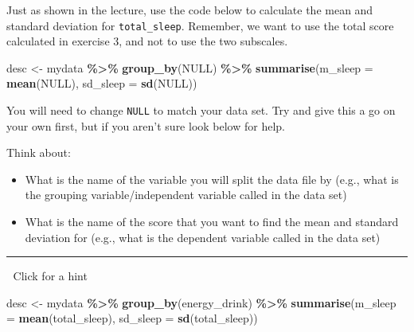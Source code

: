 \documentclass[
]{book}
\newenvironment{Shaded}{\begin{snugshade}}{\end{snugshade}}
\newcommand{\AttributeTok}[1]{\textcolor[rgb]{0.13,0.29,0.53}{#1}}
\newcommand{\ConstantTok}[1]{\textcolor[rgb]{0.56,0.35,0.01}{#1}}
\newcommand{\FunctionTok}[1]{\textcolor[rgb]{0.13,0.29,0.53}{\textbf{#1}}}
\newcommand{\NormalTok}[1]{#1}
\newcommand{\OtherTok}[1]{\textcolor[rgb]{0.56,0.35,0.01}{#1}}
\newcommand{\SpecialCharTok}[1]{\textcolor[rgb]{0.81,0.36,0.00}{\textbf{#1}}}
\begin{document}
Just as shown in the lecture, use the code below to calculate the mean and standard deviation for \texttt{total\_sleep}. Remember, we want to use the total score calculated in exercise 3, and not to use the two subscales.

\begin{Shaded}
\begin{Highlighting}[]
\NormalTok{desc }\OtherTok{\textless{}{-}}\NormalTok{  mydata }\SpecialCharTok{\%\textgreater{}\%}
  \FunctionTok{group\_by}\NormalTok{(}\ConstantTok{NULL}\NormalTok{) }\SpecialCharTok{\%\textgreater{}\%}
  \FunctionTok{summarise}\NormalTok{(}\AttributeTok{m\_sleep =} \FunctionTok{mean}\NormalTok{(}\ConstantTok{NULL}\NormalTok{),}
            \AttributeTok{sd\_sleep =} \FunctionTok{sd}\NormalTok{(}\ConstantTok{NULL}\NormalTok{))}
\end{Highlighting}
\end{Shaded}

You will need to change \texttt{NULL} to match your data set. Try and give this a go on your own first, but if you aren't sure look below for help.

Think about:

\begin{itemize}
\item
  What is the name of the variable you will split the data file by (e.g., what is the grouping variable/independent variable called in the data set)
\item
  What is the name of the score that you want to find the mean and standard deviation for (e.g., what is the dependent variable called in the data set)
\end{itemize}

\begin{center}\rule{0.5\linewidth}{0.5pt}\end{center}

👀 Click for a hint

\begin{Shaded}
\begin{Highlighting}[]
\NormalTok{desc }\OtherTok{\textless{}{-}}\NormalTok{  mydata }\SpecialCharTok{\%\textgreater{}\%}
  \FunctionTok{group\_by}\NormalTok{(energy\_drink) }\SpecialCharTok{\%\textgreater{}\%}
  \FunctionTok{summarise}\NormalTok{(}\AttributeTok{m\_sleep =} \FunctionTok{mean}\NormalTok{(total\_sleep),}
            \AttributeTok{sd\_sleep =} \FunctionTok{sd}\NormalTok{(total\_sleep))}
\end{Highlighting}
\end{Shaded}
\end{document}
